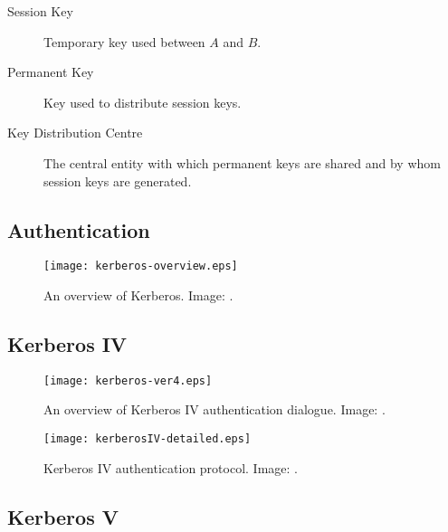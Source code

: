 \documentclass{beamer}
\begin{document}
\begin{frame}{\insertsubsectionhead}
  \begin{description}
    \item[Session Key] Temporary key used between \(A\) and \(B\).

    \item[Permanent Key] Key used to distribute session keys.

    \item[Key Distribution Centre] The central entity with which permanent keys 
      are shared and by whom session keys are generated.

  \end{description}
\end{frame}

\subsection{Authentication}

\begin{frame}{\insertsubsectionhead}
  \begin{figure}
    \texttt{[image: kerberos-overview.eps]}
    \caption{An overview of Kerberos.
      Image: \cite{Stallings2013nse}.
    }
  \end{figure}
\end{frame}

\subsection{Kerberos IV}

\begin{frame}{\insertsubsectionhead}
  \begin{figure}
    \texttt{[image: kerberos-ver4.eps]}
    \caption{An overview of Kerberos IV authentication dialogue.
      Image: \cite{Stallings2013nse}.
    }
  \end{figure}
\end{frame}

\begin{frame}{\insertsubsectionhead}
  \begin{figure}
    \texttt{[image: kerberosIV-detailed.eps]}
    \caption{Kerberos IV authentication protocol.
      Image: \cite{Stallings2013nse}.
    }
  \end{figure}
\end{frame}

\subsection{Kerberos V}
\end{document}
